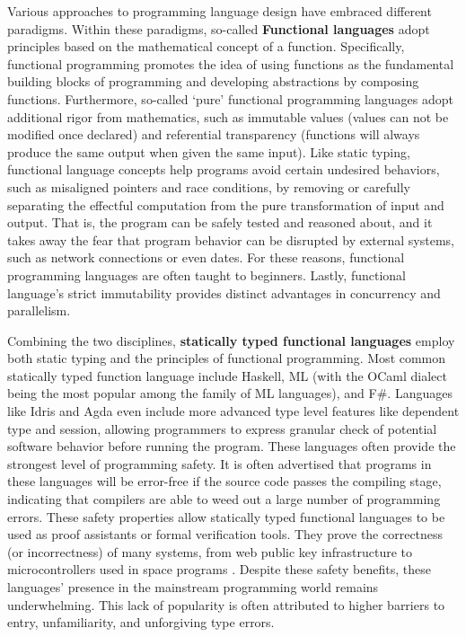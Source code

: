 Various approaches to programming language design have embraced different paradigms. Within these paradigms, so-called \textbf{Functional languages} adopt principles based on the mathematical concept of a function. Specifically, functional programming promotes the idea of using functions as the fundamental building blocks of programming and developing abstractions by composing functions. 
Furthermore, so-called `pure' functional programming languages adopt additional rigor from mathematics, such as immutable values (values can not be modified once declared) and referential transparency (functions will always produce the same output when given the same input).  
Like static typing, functional language concepts help programs avoid certain undesired behaviors, such as misaligned pointers and race conditions, by removing or carefully separating the effectful computation from the pure transformation of input and output.
That is, the program can be safely tested and reasoned about, and it takes away the fear that program behavior can be disrupted by external systems, such as network connections or even dates.  For these reasons, functional programming languages are often taught to beginners. Lastly, functional language's strict immutability provides distinct advantages in concurrency and parallelism.


Combining the two disciplines, \textbf{statically typed functional languages} employ both static typing and the principles of functional programming. Most common statically typed function language include Haskell,  ML (with the OCaml dialect being the most popular among the family of ML languages), and F\#. Languages like Idris and Agda even include more advanced type level features like dependent type and session, allowing programmers to express granular check of potential software behavior before running the program. These languages often provide the strongest level of programming safety. It is often advertised that programs in these languages will be error-free if the source code passes the compiling stage, indicating that compilers are able to weed out a large number of programming errors. These safety properties allow statically typed functional languages to be used as proof assistants or formal verification tools. They prove the correctness (or incorrectness) of many systems, from web public key infrastructure \cite{Bhargavan2021-no} to microcontrollers used in space programs \cite{Mokhov2019-zj}. Despite these safety benefits, these languages' presence in the mainstream programming world remains underwhelming. This lack of popularity is often attributed to higher barriers to entry, unfamiliarity, and unforgiving type errors.


